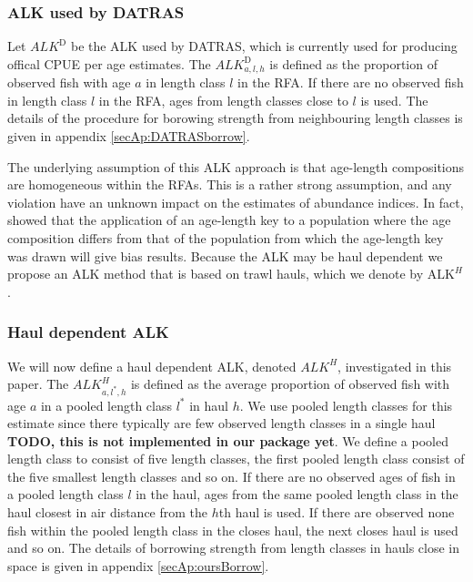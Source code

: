 \documentclass[a4paper 12pt]{article}
\numberwithin{equation}{section}
\begin{document}
\subsubsection*{ALK used by DATRAS}
Let $ALK^{\text{D}}$ be the ALK used by DATRAS, which is currently used for producing offical CPUE per age estimates. 
The $ALK^{\text{D}}_{a,l,h}$ is defined as the proportion of observed fish with age $a$ in length class $l$ in the RFA. If there are no observed fish in length class $l$ in the RFA, ages from length classes close to $l$ is used. The details of the procedure for borowing strength from neighbouring length classes is given in appendix \ref{secAp:DATRASborrow}. 

The underlying assumption of this ALK approach is that age-length compositions are homogeneous within the RFAs. This is a rather strong assumption, and any violation have an unknown impact on the estimates of abundance indices. In fact, \citet{kimura1977statistical} showed that the application of an age-length key  to a population where the age composition differs from that of the population from which the age-length key was drawn will give bias results. Because the ALK may be haul dependent we propose an ALK method that is based on trawl hauls, which we denote by $\mathrm{ALK}^{H}$. %

\subsubsection*{Haul dependent ALK}
We will now define a haul dependent ALK, denoted  $ALK^{H}$, investigated in this paper. The $ALK^{H}_{a,l^*,h}$ is defined as the average proportion of observed fish with age $a$ in a pooled length class $l^*$ in haul $h$. We use pooled length classes for this estimate since there typically are few observed length classes in a single haul {\bf TODO, this is not implemented in our package yet}. We define a pooled length class to consist of five length classes, the first pooled length class consist of the five smallest length classes and so on.  If there are no observed ages of fish in a pooled length class $l$ in the haul, ages from the same pooled length class in the haul closest in air distance from the $h$th haul is used. If there are observed none fish within the pooled length class in the closes haul, the next closes haul is used and so on.  The details of borrowing strength from length classes in hauls close in space is given in appendix \ref{secAp:oursBorrow}. 
\end{document}
